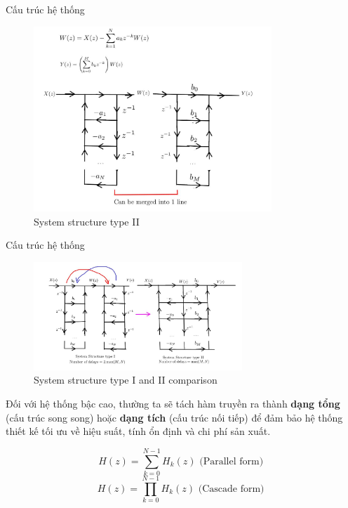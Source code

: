 \documentclass[8pt]{beamer}
\begin{document}
\begin{frame}{Cấu trúc hệ thống}
\begin{figure}[h]
			\includegraphics[width=0.8\textwidth]{5.jpg}
			\caption{System structure type II}			\label{fig:re5}

		\end{figure}
\end{frame}
\begin{frame}{Cấu trúc hệ thống}
\begin{figure}[h]
			\includegraphics[width=0.7\textwidth]{6.jpg}
			\caption{System structure type I and II comparison}			\label{fig:re6}

		\end{figure}
	Đối với hệ thống bậc cao, thường ta sẽ tách hàm truyền ra thành \textbf{dạng tổng} (cấu trúc song song) hoặc \textbf{dạng tích} (cấu trúc nối tiếp) để đảm bảo hệ thống thiết kế tối ưu về hiệu suất, tính ổn định và chi phí sản xuất.

	$$H(z)=\sum_{k=0}^{N-1}H_{k}(z)\text{ (Parallel form) }$$
	$$H(z)=\prod_{k=0}^{N-1}H_{k}(z)\text{ (Cascade form) }$$
\end{frame}
\end{document}
